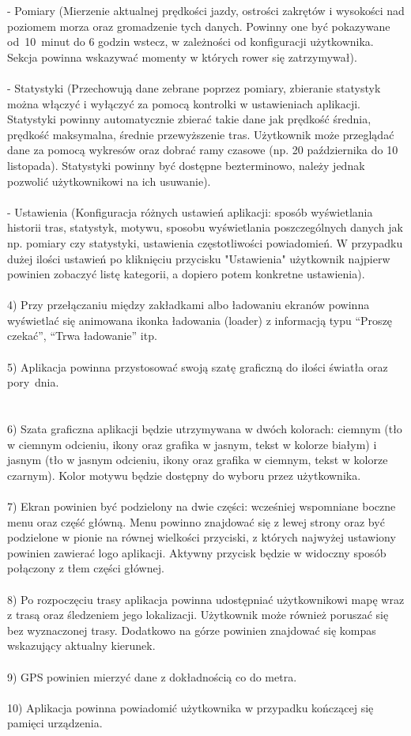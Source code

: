 - Pomiary (Mierzenie aktualnej prędkości jazdy, ostrości zakrętów i wysokości nad poziomem morza oraz gromadzenie tych danych. Powinny one być pokazywane od~10~minut do 6 godzin wstecz, w zależności od konfiguracji użytkownika. Sekcja powinna wskazywać momenty w których rower się zatrzymywał). \\\\
- Statystyki (Przechowują dane zebrane poprzez pomiary, zbieranie statystyk można włączyć i wyłączyć za pomocą kontrolki w ustawieniach aplikacji. Statystyki powinny automatycznie zbierać takie dane jak prędkość średnia, prędkość maksymalna, średnie przewyższenie tras. Użytkownik może przeglądać dane za pomocą wykresów oraz dobrać ramy czasowe (np. 20 października do 10 listopada). Statystyki powinny być dostępne bezterminowo, należy jednak pozwolić użytkownikowi na ich usuwanie). \\\\
- Ustawienia (Konfiguracja różnych ustawień aplikacji: sposób wyświetlania historii tras, statystyk, motywu, sposobu wyświetlania poszczególnych danych jak np. pomiary czy statystyki, ustawienia częstotliwości powiadomień. W przypadku dużej ilości ustawień po kliknięciu przycisku "Ustawienia" użytkownik najpierw powinien zobaczyć listę kategorii, a dopiero potem konkretne ustawienia). \\\\
4) Przy przełączaniu między zakładkami albo ładowaniu ekranów powinna wyświetlać się animowana ikonka ładowania (loader) z informacją typu ``Proszę czekać'', ``Trwa ładowanie'' itp. \\\\
5) Aplikacja powinna przystosować swoją szatę graficzną do ilości światła oraz pory~dnia. \\\\\\
6) Szata graficzna aplikacji będzie utrzymywana w dwóch kolorach: ciemnym (tło w ciemnym odcieniu, ikony oraz grafika w jasnym, tekst w kolorze białym) i jasnym (tło w jasnym odcieniu, ikony oraz grafika w ciemnym, tekst w kolorze czarnym). Kolor motywu będzie dostępny do wyboru przez użytkownika. \\\\
7) Ekran powinien być podzielony na dwie części: wcześniej wspomniane boczne menu oraz część główną. Menu powinno znajdować się z lewej strony oraz być podzielone w pionie na równej wielkości przyciski, z których najwyżej ustawiony powinien zawierać logo aplikacji. Aktywny przycisk będzie w widoczny sposób połączony z tłem części głównej. \\\\
8) Po rozpoczęciu trasy aplikacja powinna udostępniać użytkownikowi mapę wraz z trasą oraz śledzeniem jego lokalizacji. Użytkownik może również poruszać się bez wyznaczonej trasy. Dodatkowo na górze powinien znajdować się kompas wskazujący aktualny kierunek. \\\\
9) GPS powinien mierzyć dane z dokładnością co do metra. \\\\
10) Aplikacja powinna powiadomić użytkownika w przypadku kończącej się pamięci urządzenia. \\\\